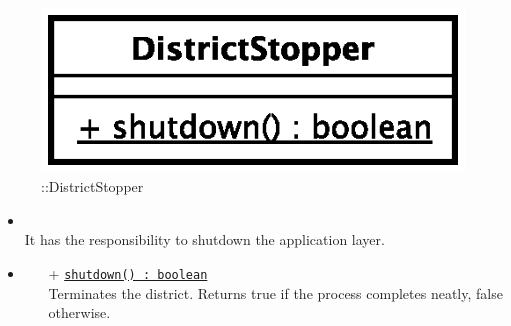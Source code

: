 \begin{figure}[h]
\centering
\includegraphics[scale=0.6,keepaspectratio]{images/solution/app/backend/district_stopper.eps}
\caption{\pReactive::DistrictStopper}
\label{fig:sd-app-district-stopper}
\end{figure}
\FloatBarrier
\begin{itemize}
  \item \textbf{\descr} \\
  It has the responsibility to shutdown the application layer.
  \item \textbf{\ops}
  \begin{itemize}
    \item[+] \texttt{\underline{shutdown() : boolean}} \\
    Terminates the district. Returns true if the process completes neatly,
    false otherwise.
  \end{itemize}
\end{itemize} 
